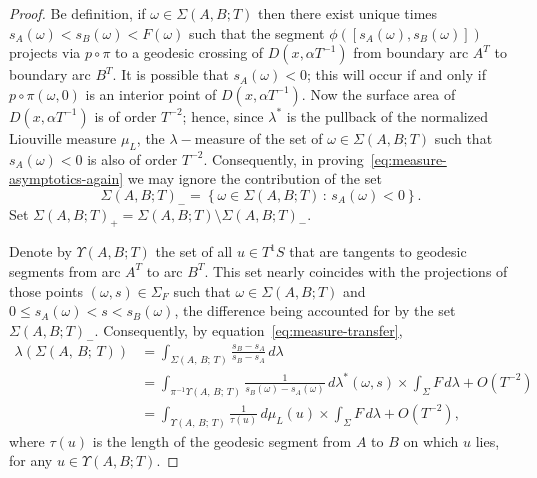 \documentclass[10pt]{amsart}
\theoremstyle{definition}\newtheorem{defi}[theo]{Definition}\newtheorem{rema}[theo]{Remark}\newtheorem{exam}[theo]{Example}\newtheorem{exem}[theo]{Example}\newtheorem{nota}[theo]{Notation}
\newcommand{\xset}[1]{\left\{ #1 \right\}}
\begin{document}
\begin{proof}
Be definition, if $\omega \in \Sigma(A,B;T)$ then there exist unique times\linebreak$s_{A}(\omega) <s_{B}(\omega)<F(\omega)$ such that the segment $\phi ([s_{A}(\omega),s_{B}(\omega)])$ projects via $p\circ\pi$ to a geodesic crossing of $D(x,\alpha T^{-1})$ from boundary arc $A^{T}$ to boundary arc $B^{T}$. It is possible that $s_{A}(\omega)<0$; this will occur if and only if $p\circ\pi (\omega,0)$ is an interior point of $D(x, \alpha T^{-1})$. Now the surface area of $D(x,\alpha T^{-1})$ is of order $T^{-2}$; hence, since $\lambda^{*}$ is the pullback of the normalized Liouville measure $\mu_{L}$, the $\lambda-$measure of the set of $\omega \in \Sigma(A,B;T)$ such that $s_{A}(\omega)<0$ is also of order $T^{-2}$. Consequently, in proving~\eqref{eq:measure-asymptotics-again} we may ignore the contribution of the set
\[
\Sigma(A,B;T)_{-}=\xset {\omega \in \Sigma(A,B;T)\,:\, s_{A}(\omega)<0}.
\]
Set $\Sigma(A,B;T)_{+}=\Sigma(A,B;T)\setminus \Sigma(A,B;T)_{-}$.



Denote by $\Upsilon (A,B;T)$ the set of all $u\in T^1S$ that are tangents to geodesic segments from arc $A^{T}$ to arc $B^{T}$. This set nearly coincides with the projections of those points $(\omega,s)\in \Sigma_{F}$ such that $\omega \in \Sigma (A,B;T)$ and $0\leq s_{A} (\omega)<s<s_{B} (\omega)$, the difference being accounted for by the set $\Sigma(A,B;T)_{-}$. Consequently, by equation~\eqref{eq:measure-transfer},
\begin{align*}
\lambda (\Sigma (A,\,B;\,T))&= \int_{\Sigma (A,\,B;\,T)}\frac{s_{B}-s_{A}}{s_{B}-s_{A}} \,d\lambda \\
&=\int_{\pi^{-1}\Upsilon (A,\,B;\,T)} \frac{1}{s_{B} (\omega)-s_{A}(\omega)} \,d\lambda^{*} (\omega,s) \times \int_{\Sigma}F\,d\lambda +O\left(T^{-2}\right)\\
&=\int_{\Upsilon (A,\,B;\,T)} \frac{1}{\tau (u)} \,d\mu_{L} (u) \times\int_{\Sigma}F\,d\lambda +O\left(T^{-2}\right),
\end{align*}
where $\tau(u)$ is the length of the geodesic segment from $A$ to $B$ on which $u$ lies, for any $u\in \Upsilon (A,B;T)$.


\end{proof}
\end{document}
